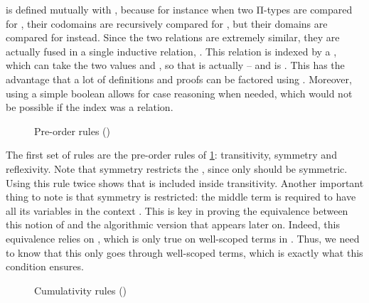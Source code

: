  is defined mutually with , because for instance when two Π-types
are compared for , their codomains are recursively compared for ,
but their domains are compared for  instead.%
Since the two relations are extremely similar, they are actually fused in a single
inductive relation, .
This relation is indexed by a  , which can take
the two values  and , so that 
is actually  – and  is
. This has the advantage that a lot of definitions and proofs
can be factored using . Moreover, using a simple boolean allows for case reasoning
when needed, which would not be possible if the index was \eg a relation.%

\begin{figure}[h]
  \ContinuedFloat*
  \caption{Pre-order rules ()}
  \label{fig:meta-cumul-struct}
\end{figure}

The first set of rules are the pre-order rules of \cref{fig:meta-cumul-struct}:
transitivity, symmetry and reflexivity. Note that symmetry restricts the ,
since only  should be symmetric. Using this rule twice shows that 
 is included inside transitivity.
Another important thing to note is that symmetry is restricted: the middle term is required
to have all its variables in the context .%
This is key in proving the equivalence between this notion of  and the
algorithmic version that appears later on. Indeed, this equivalence relies on ,
which is only true on well-scoped terms in . Thus, we need to know that this
 only goes through well-scoped terms, which is exactly what this
condition ensures.

\begin{figure}[h]
  \ContinuedFloat
  \caption{Cumulativity rules ()}
  \label{fig:meta-cumul-cumul}
\end{figure}

